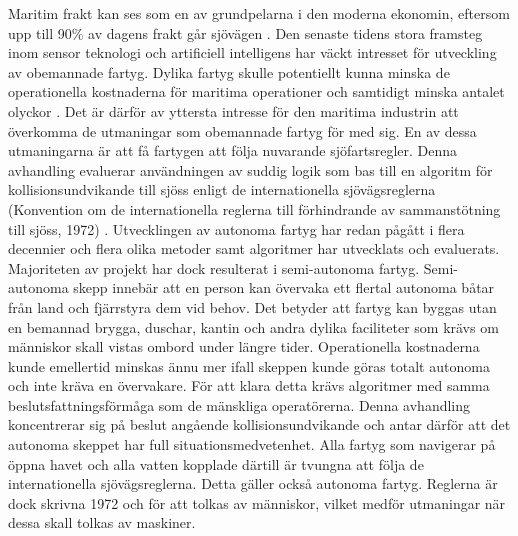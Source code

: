 \renewcommand{\thesection}{\arabic{section}}
\label{app:swed_sum} %

Maritim frakt kan ses som en av grundpelarna i den moderna ekonomin, eftersom upp till 90\% av dagens frakt går sjövägen \cite{percent_trade}. Den senaste tidens stora framsteg inom sensor teknologi och artificiell intelligens har väckt intresset för utveckling av obemannade fartyg. Dylika fartyg skulle  potentiellt kunna minska de operationella kostnaderna för maritima operationer och samtidigt minska antalet olyckor \cite{manley2008unmanned,marine_casualities_incidents_2017}. Det är därför av yttersta intresse för den maritima industrin att överkomma de utmaningar som obemannade fartyg för med sig. En av dessa utmaningarna är att få fartygen att följa nuvarande sjöfartsregler. Denna avhandling  evaluerar användningen av suddig logik som bas till en algoritm för kollisionsundvikande till sjöss enligt  de internationella sjövägsreglerna (Konvention om de internationella reglerna till förhindrande av sammanstötning till sjöss, 1972) \cite{colreg}.
Utvecklingen av autonoma fartyg har redan pågått i flera decennier och flera olika metoder samt algoritmer har utvecklats och evaluerats. Majoriteten av projekt har dock resulterat i semi-autonoma fartyg. Semi-autonoma skepp innebär att en person kan övervaka ett flertal autonoma båtar från land och fjärrstyra dem vid behov. Det betyder att fartyg kan byggas utan en bemannad brygga, duschar, kantin och andra dylika faciliteter som krävs om människor skall vistas ombord under längre tider. Operationella kostnaderna kunde emellertid minskas ännu mer ifall skeppen kunde göras totalt autonoma och inte kräva en övervakare. För att klara detta krävs algoritmer med samma beslutsfattningsförmåga som de mänskliga operatörerna. Denna avhandling koncentrerar sig på beslut angående kollisionsundvikande och antar därför att det autonoma skeppet har full situationsmedvetenhet.
Alla fartyg som navigerar på öppna havet och alla vatten kopplade därtill är tvungna att följa de internationella sjövägsreglerna. Detta gäller också autonoma fartyg. Reglerna är dock skrivna 1972 och för att tolkas av människor, vilket medför utmaningar när dessa skall tolkas av maskiner.

